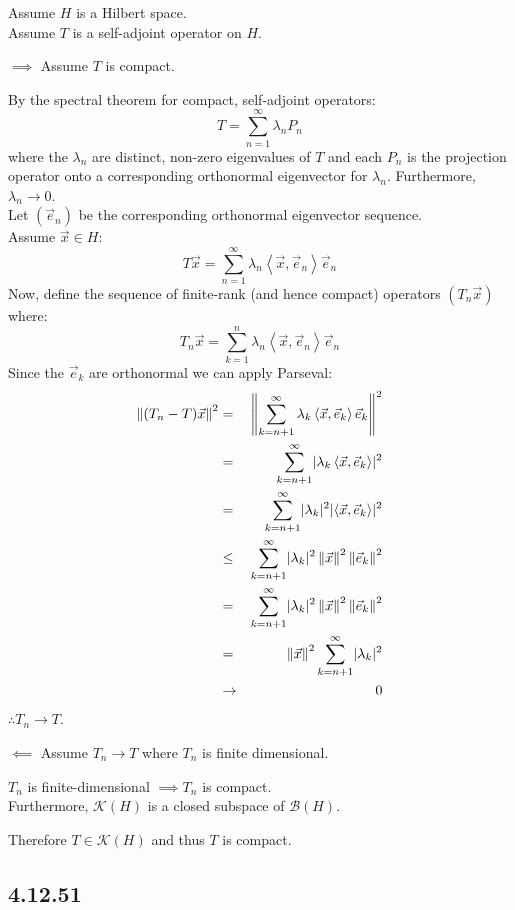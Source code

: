 \documentclass[letterpaper,12pt,fleqn]{article}
\newcommand{\ve}{\vec{e}}
\newcommand{\vx}{\vec{x}}
\newcommand{\norm}[1]{\left\|#1\right\|}
\newcommand{\inner}[1]{\left<#1\right>}
\newcommand{\mk}{\mathcal{K}}
\newcommand{\mb}{\mathcal{B}}
\renewcommand{\l}{\lambda}
\begin{document}
Assume $H$ is a Hilbert space. \\
Assume $T$ is a self-adjoint operator on $H$.
\begin{description}
\item $\implies$ Assume $T$ is compact.

  By the spectral theorem for compact, self-adjoint operators:
  \[T=\sum_{n=1}^{\infty}\l_nP_n\]
  where the $\l_n$ are distinct, non-zero eigenvalues of $T$ and each $P_n$
  is the projection operator onto a corresponding orthonormal eigenvector
  for $\l_n$.
  Furthermore, $\l_n\to0$. \\
  Let $(\ve_n)$ be the corresponding orthonormal eigenvector sequence. \\
  Assume $\vx\in H$:
  \[T\vx=\sum_{n=1}^{\infty}\l_n\inner{\vx,\ve_n}\ve_n\]
  Now, define the sequence of finite-rank (and hence compact) operators
  $(T_n\vx)$ where:
  \[T_n\vx=\sum_{k=1}^n\l_n\inner{\vx,\ve_n}\ve_n\]
  Since the $\ve_k$ are orthonormal we can apply Parseval:
  \begin{eqnarray*}
    \norm{(T_n-T)\vx}^2 &=&
    \norm{\sum_{k=n+1}^{\infty}\l_k\inner{\vx,\ve_k}\ve_k}^2 \\
    &=& \sum_{k=n+1}^{\infty}\abs{\l_k\inner{\vx,\ve_k}}^2 \\
    &=& \sum_{k=n+1}^{\infty}\abs{\l_k}^2\abs{\inner{\vx,\ve_k}}^2 \\
    &\le& \sum_{k=n+1}^{\infty}\abs{\l_k}^2\norm{\vx}^2\norm{\ve_k}^2 \\
    &=& \sum_{k=n+1}^{\infty}\abs{\l_k}^2\norm{\vx}^2\norm{\ve_k}^2 \\
    &=& \norm{\vx}^2\sum_{k=n+1}^{\infty}\abs{\l_k}^2 \\
    &\to& 0
  \end{eqnarray*}
  $\therefore T_n\to T$.

\item $\impliedby$ Assume $T_n\to T$ where $T_n$ is finite dimensional.

  $T_n$ is finite-dimensional $\implies T_n$ is compact. \\
  Furthermore, $\mk(H)$ is a closed subspace of $\mb(H)$.

  Therefore $T\in\mk(H)$ and thus $T$ is compact.
\end{description}

\subsection*{4.12.51}
\end{document}
